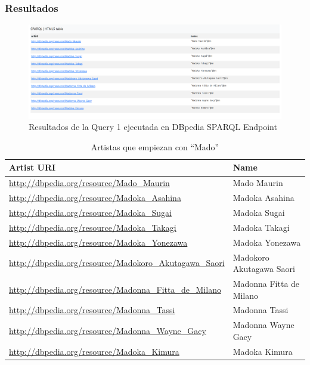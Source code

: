 \documentclass[12pt,a4paper]{article}
\begin{document}
\subsubsection{Resultados}

\begin{figure}[H]
    \centering
    \includegraphics[width=\textwidth]{screenshots/Query1.png}
    \caption{Resultados de la Query 1 ejecutada en DBpedia SPARQL Endpoint}
    \label{fig:query1_results}
\end{figure}

\begin{table}[H]
    \centering
    \caption{Artistas que empiezan con ``Mado''}
    \label{tab:query1_results}
    \begin{tabular}{|l|l|}
        \hline
        \textbf{Artist URI} & \textbf{Name} \\
        \hline
        \url{http://dbpedia.org/resource/Mado_Maurin} & Mado Maurin \\
        \url{http://dbpedia.org/resource/Madoka_Asahina} & Madoka Asahina \\
        \url{http://dbpedia.org/resource/Madoka_Sugai} & Madoka Sugai \\
        \url{http://dbpedia.org/resource/Madoka_Takagi} & Madoka Takagi \\
        \url{http://dbpedia.org/resource/Madoka_Yonezawa} & Madoka Yonezawa \\
        \url{http://dbpedia.org/resource/Madokoro_Akutagawa_Saori} & Madokoro Akutagawa Saori \\
        \url{http://dbpedia.org/resource/Madonna_Fitta_de_Milano} & Madonna Fitta de Milano \\
        \url{http://dbpedia.org/resource/Madonna_Tassi} & Madonna Tassi \\
        \url{http://dbpedia.org/resource/Madonna_Wayne_Gacy} & Madonna Wayne Gacy \\
        \url{http://dbpedia.org/resource/Madoka_Kimura} & Madoka Kimura \\
        \hline
    \end{tabular}
\end{table}
\end{document}
